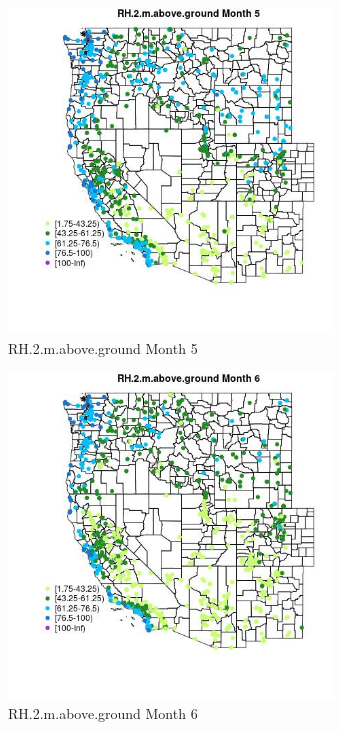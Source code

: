 \begin{figure} 
\centering  
\includegraphics[width=0.77\textwidth]{Code_Outputs/Report_ML_input_PM25_Step4_part_f_de_duplicated_aveswNAs_MapObsMo5RH2maboveground.jpg} 
\caption{\label{fig:Report_ML_input_PM25_Step4_part_f_de_duplicated_aveswNAsMapObsMo5RH2maboveground}RH.2.m.above.ground Month 5} 
\end{figure} 
 

\clearpage 

\begin{figure} 
\centering  
\includegraphics[width=0.77\textwidth]{Code_Outputs/Report_ML_input_PM25_Step4_part_f_de_duplicated_aveswNAs_MapObsMo6RH2maboveground.jpg} 
\caption{\label{fig:Report_ML_input_PM25_Step4_part_f_de_duplicated_aveswNAsMapObsMo6RH2maboveground}RH.2.m.above.ground Month 6} 
\end{figure} 
 

